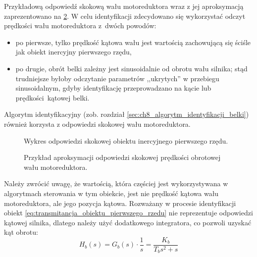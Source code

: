 Przykładową odpowiedź skokową wału motoreduktora wraz z jej aproksymacją zaprezentowano na \cref{fig:identyfikacja_belki}. W celu identyfikacji zdecydowano się wykorzystać odczyt prędkości wału motoreduktora z~dwóch powodów:
\begin{itemize}
    \item po pierwsze, tylko prędkość kątowa wału jest wartością zachowującą się ściśle jak obiekt inercyjny pierwszego rzędu,
    \item po drugie, obrót belki zależny jest sinusoidalnie od obrotu wału silnika; stąd trudniejsze byłoby odczytanie parametrów ,,ukrytych'' w przebiegu sinusoidalnym, gdyby identyfikację przeprowadzano na kącie lub prędkości kątowej belki.
\end{itemize}
Algorytm identyfikacyjny (zob. rozdział \ref{sec:ch8_algorytm_identyfikacji_belki}) również korzysta z odpowiedzi skokowej wału motoreduktora.

\begin{figure}[ht]
    \centering
    \caption{Wykres odpowiedzi skokowej obiektu inercyjnego pierwszego rzędu.}
    \label{fig:odpowiedz_skokowa_obiektu_pierwszego_rzedu}
\end{figure}

\begin{figure}[ht]
    \centering
        
    \caption{Przykład aproksymacji odpowiedzi skokowej prędkości obrotowej wału motoreduktora.}
    \label{fig:identyfikacja_belki}
\end{figure}

Należy zwrócić uwagę, że wartością, która częściej jest wykorzystywana w algorytmach sterowania w tym obiekcie, jest nie prędkość kątowa wału motoreduktora, ale jego pozycja kątowa. Rozważany w procesie identyfikacji obiekt \eqref{eq:transmitancja_obiektu_pierwszego_rzedu} nie reprezentuje odpowiedzi kątowej silnika, dlatego należy użyć dodatkowego integratora, co pozwoli uzyskać kąt obrotu:
\begin{equation}
    H_b(s) = G_b(s) \cdot \frac{1}{s} = \frac{K_b}{T_b s^2 + s} \label{eq:transmitancja_silnik_odp_katowa}
\end{equation}

